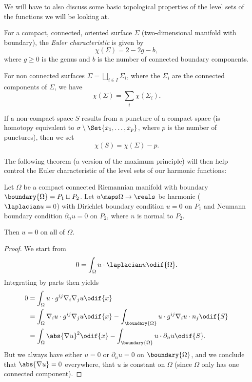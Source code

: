 \documentclass[titlepage,numbers=noenddot,headinclude,oneside,%
footinclude=true,cleardoublepage=empty,%
BCOR=5mm,paper=a4,fontsize=11pt,%
english,%
]{scrartcl}
\begin{document}
We will have to also discuss some basic topological properties of the level sets of the functions we will be looking at.
\begin{definition}
    For a compact, connected, oriented surface \( \Sigma \) (two-dimensional manifold with boundary), the \emph{Euler characteristic} is given by
    \begin{equation}
        \chi(\Sigma)=2-2g-b,\label{eq:def_euler_characteristic}
    \end{equation}
    where \( g\geq 0 \) is the genus and \( b \) is the number of connected boundary components.

    For non connected surfaces \( \Sigma=\bigsqcup_{i\in I} \Sigma_i \), where the \( \Sigma_i \) are the connected components of \( \Sigma \), we have
    \begin{equation*}
        \chi(\Sigma)=\sum_{i}\chi(\Sigma_i).
    \end{equation*}

    If a non-compact space \( S \) results from a puncture of a compact space (is homotopy equivalent to \( \sigma\setminus \Set{x_1,\dotsc,x_p} \), where \( p \) is the number of punctures), then we set
    \begin{equation*}
        \chi(S)=\chi(\Sigma)-p.\label{eq:def_euler_characteristic_non-compact}
    \end{equation*}
\end{definition}
The following theorem (a version of the maximum principle) will then help control the Euler characteristic of the level sets of our harmonic functions:
\begin{theorem}\label{thm:maximum_principle}
 Let \( \Omega \) be a compact connected Riemannian manifold with boundary \( \boundary{\Omega}=P_1\sqcup P_2 \). Let \( u\maps \Omega\to \reals \) be harmonic (\ie \( \laplacian u=0 \)) with Dirichlet boundary condition \( u= 0 \) on \( P_1 \) and Neumann boundary condition \( \partial_n u=0 \) on \( P_2 \), where \( n \) is normal to \( P_2 \).

 Then \( u=0 \) on all of \( \Omega \).
\end{theorem}
\begin{proof}
    We start from
    \begin{equation*}
        0=\int_\Omega u\cdot \laplacian u\odif{\Omega}.
    \end{equation*}
    Integrating by parts then yields
    \begin{align*}
        0&=\int_\Omega u\cdot g^{ij}\nabla_i \nabla_j u\odif{x}\\
        &=\int_\Omega \nabla_i u\cdot g^{ij} \nabla_j u\odif{x}-\int_{\boundary{\Omega}}u\cdot g^{ij}\nabla_i u \cdot n_j \odif{S}\\
        &=\int_\Omega \abs{\nabla u}^2\odif{x}-\int_{\boundary{\Omega}}u\cdot \partial_n u\odif{S}.
    \end{align*}
    But we always have either \( u=0 \) or \( \partial_n u=0 \) on \( \boundary{\Omega} \), and we conclude that \( \abs{\nabla u}=0 \) everywhere, \ie that \( u \) is constant on \( \Omega \) (since \( \Omega \) only has one connected component).
\end{proof}
\end{document}
